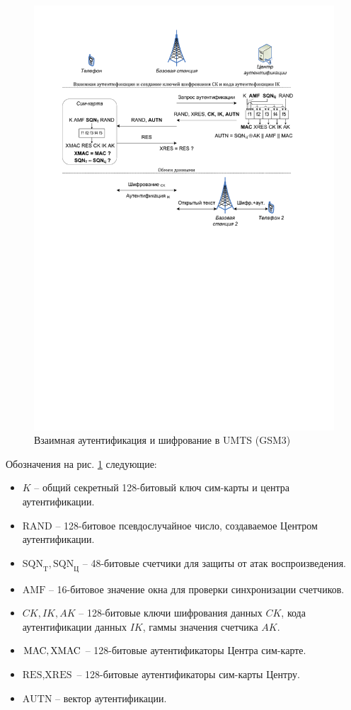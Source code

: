 \begin{figure}[h!]
	\centering
	\includegraphics[width=\textwidth]{pic/gsm3}
	\caption{Взаимная аутентификация и шифрование в UMTS (GSM3)\label{fig:gsm3}}
\end{figure}

Обозначения на рис. \ref{fig:gsm3} следующие:
\begin{itemize}
    \item $K$ -- общий секретный 128-битовый ключ сим-карты и центра аутентификации.
    \item $\textrm{RAND}$ -- 128-битовое псевдослучайное число, создаваемое Центром аутентификации.
    \item $\textrm{SQN}_\textrm{T}, \textrm{SQN}_\textrm{Ц}$ -- 48-битовые счетчики для защиты от атак воспроизведения.
    \item $\textrm{AMF}$ -- 16-битовое значение окна для проверки синхронизации счетчиков.
    \item $CK, IK, AK$ -- 128-битовые ключи шифрования данных $CK$, кода аутентификации данных $IK$, гаммы значения счетчика $AK$.
    \item $\textrm{MAC}, \textrm{XMAC}$ -- 128-битовые аутентификаторы Центра сим-карте.
    \item $\textrm{RES}, \textrm{XRES}$ -- 128-битовые аутентификаторы сим-карты Центру.
    \item $\textrm{AUTN}$ -- вектор аутентификации.
\end{itemize}

